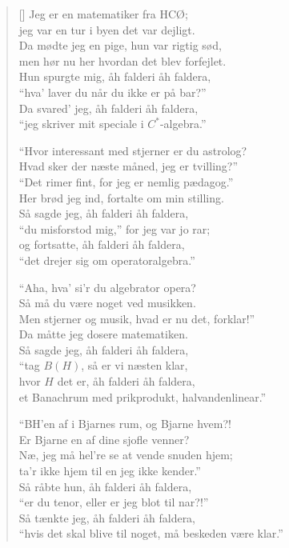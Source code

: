 \begin{multicols}{2}
\settowidth{\versewidth}{Men stjerner og musik, hvad er nu det, forklar!''}
\begin{verse}[\versewidth]
Jeg er en matematiker fra HCØ;\\
jeg var en tur i byen det var dejligt.\\
Da mødte jeg en pige, hun var rigtig sød,\\
men hør nu her hvordan det blev forfejlet.\\
Hun spurgte mig, åh falderi åh faldera,\\
``hva' laver du når du ikke er på bar?''\\
Da svared' jeg, åh falderi åh faldera,\\
``jeg skriver mit speciale i $C^*$-algebra.''

``Hvor interessant med stjerner er du astrolog?\\
Hvad sker der næste måned, jeg er tvilling?''\\
``Det rimer fint, for jeg er nemlig pædagog.''\\
Her brød jeg ind, fortalte om min stilling.\\
Så sagde jeg, åh falderi åh faldera,\\
``du misforstod mig,'' for jeg var jo rar;\\
og fortsatte, åh falderi åh faldera,\\
``det drejer sig om operatoralgebra.''

``Aha, hva' si’r du algebrator opera?\\
Så må du være noget ved musikken.\\
Men stjerner og musik, hvad er nu det, forklar!''\\
Da måtte jeg dosere matematiken.\\
Så sagde jeg, åh falderi åh faldera,\\
``tag $B(H)$, så er vi næsten klar,\\
hvor $H$ det er, åh falderi åh faldera,\\
et Banachrum med prikprodukt, halvandenlinear.''

\columnbreak

``BH'en af i Bjarnes rum, og Bjarne hvem?!\\
Er Bjarne en af dine sjofle venner?\\
Næ, jeg må hel're se at vende snuden hjem;\\
ta'r ikke hjem til en jeg ikke kender.''\\
Så råbte hun, åh falderi åh faldera,\\
``er du tenor, eller er jeg blot til nar?!''\\
Så tænkte jeg, åh falderi åh faldera,\\
``hvis det skal blive til noget, må beskeden være klar.''


\end{verse}
\end{multicols}
